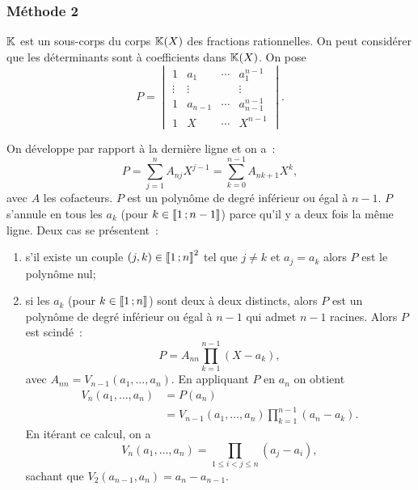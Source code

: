 \subsubsection{Méthode 2}

\(\mathbb{K}\) est un sous-corps du corps \(\mathbb{K}(X)\) des fractions rationnelles. On
peut considérer que les déterminants sont à coefficients dans \(\mathbb{K}(X)\).
On pose
\begin{equation}
  P = \begin{vmatrix}
    1 & a_1 & \cdots & a_1^{n-1} \\
    \vdots & \vdots &  & \vdots \\
    1 & a_{n-1} & \cdots & a_{n-1}^{n-1}\\
    1 & X     & \cdots & X^{n-1}
  \end{vmatrix}.
\end{equation}

On développe par rapport à la dernière ligne et on a~:
\begin{equation}
  P = \sum_{j=1}^n A_{nj} X^{j-1}=\sum_{k=0}^{n-1} A_{n k+1} X^{k},
\end{equation}
avec \(A\) les cofacteurs. \(P\) est un polynôme de degré inférieur ou
égal à \(n-1\). \(P\) s'annule en tous les \(a_k\) (pour \(k \in
\mathopen{\llbracket}1\mathclose{}\mathpunct{};n-1\mathclose{\rrbracket}\)) parce qu'il y a deux fois la même ligne. Deux
cas se présentent~:
\begin{enumerate}
  \item s'il existe un couple \((j,k) \in \mathopen{\llbracket}1\mathclose{}\mathpunct{};n\mathclose{\rrbracket}^2\) tel
    que \(j \neq k\) et \(a_j=a_k\) alors \(P\) est le polynôme nul;
  \item si les \(a_k\) (pour \(k \in \mathopen{\llbracket}1\mathclose{}\mathpunct{};n\mathclose{\rrbracket}\)) sont deux
    à deux distincts, alors \(P\) est un polynôme de degré inférieur ou
    égal à \(n-1\) qui admet \(n-1\) racines. Alors \(P\) est scindé~:
    \begin{equation}
      P = A_{nn} \prod_{k=1}^{n-1}(X-a_k),
    \end{equation}
    avec \(A_{nn} = V_{n-1}(a_1, \ldots, a_n)\). En appliquant \(P\) en
    \(a_n\) on obtient
    \begin{align}
      V_{n}(a_1, \ldots, a_n) &= P(a_n) \\
      &=V_{n-1}(a_1, \ldots, a_n) \prod_{k=1}^{n-1}(a_n-a_k).
    \end{align}
    En itérant ce calcul, on a
    \begin{equation}
      V_{n}(a_1, \ldots, a_n) = \prod_{1 \le i < j \leqslant n} (a_j-a_i),
    \end{equation}
    sachant que \(V_2(a_{n-1},a_n)=a_n-a_{n-1}\).
\end{enumerate}

